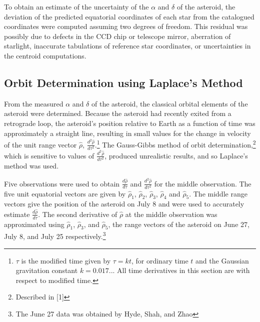 \documentclass[12pt,journal,compsoc]{IEEEtran}
\begin{document}
To obtain an estimate of the uncertainty of the $\alpha$ and $\delta$ of the asteroid, 
the deviation of the predicted equatorial coordinates of each star 
from the catalogued coordinates were computed assuming two degrees of freedom.
This residual was possibly due to defects in the CCD chip or telescope mirror, 
aberration of starlight, inaccurate tabulations of reference star coordinates, 
or uncertainties in the centroid computations.

\subsection{Orbit Determination using Laplace's Method}
From the measured $\alpha$ and $\delta$ of the asteroid, 
the classical orbital elements of the asteroid were determined. 
Because the asteroid had recently exited from a retrograde loop,
the asteroid's position relative to Earth as a function of time was approximately a straight line,
resulting in small values for the change in velocity
of the unit range vector $\hat{\rho}$, $\frac{d^2\hat{\rho}}{d\tau^2}$.\footnote{$\tau$ is the modified time given by $\tau=kt$, for ordinary time $t$ 
and the Gaussian gravitation constant $k=0.017...$
All time derivatives in this section are with respect to modified time.}
The Gauss-Gibbs method of orbit determination,\footnote{Described in [1]} which is
sensitive to values of $\frac{d^2\hat{\rho}}{d\tau^2}$, produced unrealistic results, and so Laplace's method was used.

Five observations were used to obtain $\frac{d\hat{\rho}}{d\tau}$ and $\frac{d^2\hat{\rho}}{d\tau^2}$ 
for the middle observation.
The five unit equatorial vectors are given by $\hat{\rho}_1$, $\hat{\rho}_2$, $\hat{\rho}_3$, $\hat{\rho}_4$ 
and $\hat{\rho}_5$. 
The middle range vectors give the position of the asteroid on July 8 
and were used to accurately estimate $\frac{d\hat{\rho}}{d\tau}$.
The second derivative of $\hat{\rho}$ at the middle observation was approximated 
using $\hat{\rho}_1$, $\hat{\rho}_3$, and $\hat{\rho}_5$, 
the range vectors of the asteroid on June 27, July 8, and July 25 respectively.\footnote{The June 27 data was obtained by Hyde, Shah, and Zhao} 
\end{document}
